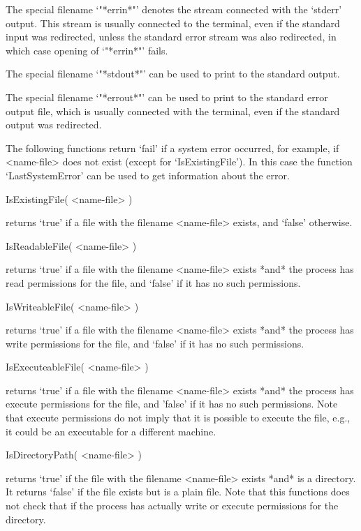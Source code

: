 The  special filename `"*errin*"' denotes   the stream connected with the
`stderr' output.  This stream is usually connected  to the terminal, even
if  the standard input was  redirected, unless the  standard error stream
was also redirected, in which case opening of `"*errin*"' fails.
    
The special filename `"*stdout*"'  can be used to  print to  the standard
output.

The special  filename `"*errout*"' can be  used to  print to the standard
error output file, which is usually  connected with the terminal, even if
the standard output was redirected.
    

The  following functions  return `fail'  if a system  error occurred, for
example, if <name-file> does not exist (except for `IsExistingFile').  In
this case  the function `LastSystemError'  can be used to get information
about the error.

\>IsExistingFile( <name-file> )

returns `true'  if   a file  with the filename   <name-file>  exists, and
`false' otherwise.

\>IsReadableFile( <name-file> )

returns `true' if a  file with the  filename <name-file> exists *and* the
{\GAP} process has read  permissions for the  file, and `false' if it has
no such permissions.

\>IsWriteableFile( <name-file> )

returns `true'  if a file with the  filename <name-file> exists *and* the
{\GAP} process has write permissions for the  file, and `false' if it has
no such permissions.

\>IsExecuteableFile( <name-file> )

returns `true' if  a file with the  filename <name-file> exists *and* the
{\GAP} process has execute  permissions for the file,  and 'false' if  it
has no such permissions.  Note that execute permissions do not imply that
it is possible to execute the file, e.g., it could be an executable for a
different machine.

\>IsDirectoryPath( <name-file> )

returns `true' if the file with  the filename <name-file> exists *and* is
a directory.  It returns `false' if the file exists but  is a plain file.
Note  that this functions does not  check that if  the {\GAP} process has
actually write or execute permissions for the directory.

